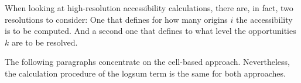 When looking at high-resolution accessibility calculations, there are, in fact,
two resolutions to consider: One that defines for how many origins $i$ the
accessibility is to be computed. And a second one that defines to what level
the opportunities $k$ are to be resolved.



%
%

The following paragraphs concentrate on the cell-based approach.
Nevertheless, the
calculation procedure of the logsum term is the same for both approaches.


